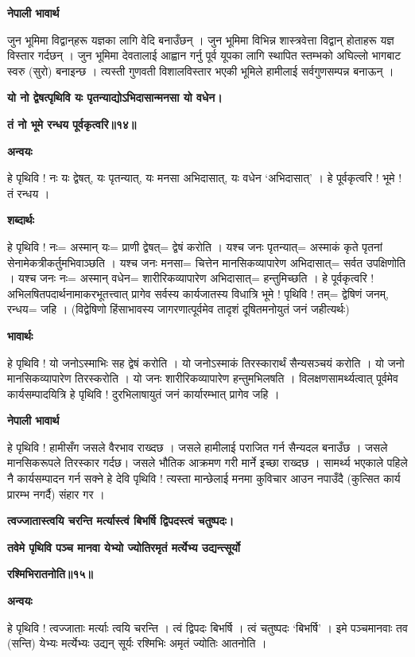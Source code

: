 \documentclass[11pt, a5paper]{article}
\begin{document}
\textbf{नेपाली भावार्थ}

जुन भूमिमा विद्वान्‌हरू यज्ञका लागि वेदि बनाउँछन् । जुन भूमिमा विभिन्न शास्त्रवेत्ता विद्वान् होताहरू यज्ञ विस्तार गर्दछन् । जुन भूमिमा देवतालाई आह्वान गर्नु पूर्व यूपका लागि स्थापित स्तम्भको अघिल्लो भागबाट स्वरु (सुरो) बनाइन्छ । त्यस्ती गुणवती विशालविस्तार भएकी भूमिले हामीलाई सर्वगुणसम्पन्न बनाऊन् ।

\textbf{यो नो द्वेषत्पृथिवि यः पृतन्याद्योऽभिदासान्मनसा यो वधेन।}

\textbf{तं नो भूमे रन्धय पूर्वकृत्वरि॥१४॥}

\textbf{अन्वयः}

हे पृथिवि ! नः यः द्वेषत्, यः पृतन्यात्, यः मनसा अभिदासात्, यः वधेन ‘अभिदासात्’ । हे पूर्वकृत्वरि ! भूमे ! तं रन्धय ।

\textbf{शब्दार्थः}

हे पृथिवि ! नः= अस्मान् यः= प्राणी द्वेषत्= द्वेषं करोति । यश्च जनः पृतन्यात्= अस्माकं कृते पृतनां सेनामेकत्रीकर्तुमभिवाञ्छति । यश्च जनः मनसा= चित्तेन मानसिकव्यापारेण अभिदासात्= सर्वत उपक्षिणोति । यश्च जनः नः= अस्मान् वधेन= शारीरिकव्यापारेण अभिदासात्= हन्तुमिच्छति । हे पूर्वकृत्वरि ! अभिलषितपदार्थनामाकरभूतत्त्वात् प्रागेव सर्वस्य कार्यजातस्य विधात्रि भूमे ! पृथिवि ! तम्= द्वेषिणं जनम्, रन्धय= जहि । (विद्वेषिणो हिंसाभावस्य जागरणात्पूर्वमेव तादृशं दूषितमनोयुतं जनं जहीत्यर्थः)

\textbf{भावार्थः}

हे पृथिवि ! यो जनोऽस्माभिः सह द्वेषं करोति । यो जनोऽस्माकं तिरस्कारार्थं सैन्यसञ्चयं करोति । यो जनो मानसिकव्यापारेण तिरस्करोति । यो जनः शारीरिकव्यापारेण हन्तुमभिलषति । विलक्षणसामर्थ्यत्वात् पूर्वमेव कार्यसम्पादयित्रि हे पृथिवि ! दुरभिलाषायुतं जनं कार्यारम्भात् प्रागेव जहि ।

\textbf{नेपाली भावार्थ}

हे पृथिवि ! हामीसँग जसले वैरभाव राख्दछ । जसले हामीलाई पराजित गर्न सैन्यदल बनाउँछ । जसले मानसिकरूपले तिरस्कार गर्दछ। जसले भौतिक आक्रमण गरी मार्ने इच्छा राख्दछ । सामर्थ्य भएकाले पहिले नै कार्यसम्पादन गर्न सक्ने हे देवि पृथिवि ! त्यस्ता मान्छेलाई मनमा कुविचार आउन नपाउँदै (कुत्सित कार्य प्रारम्भ नगर्दै) संहार गर ।

\textbf{त्वज्जातास्त्वयि चरन्ति मर्त्यास्त्वं बिभर्षि द्विपदस्त्वं चतुष्पदः।}

\textbf{तवेमे पृथिवि पञ्च मानवा येभ्यो ज्योतिरमृतं मर्त्येभ्य उद्यन्त्सूर्यो}

\textbf{रश्मिभिरातनोति॥१५॥}

\textbf{अन्वयः}

हे पृथिवि ! त्वज्जाताः मर्त्याः त्वयि चरन्ति । त्वं द्विपदः बिभर्षि । त्वं चतुष्पदः ‘बिभर्षि’ । इमे पञ्चमानवाः तव (सन्ति) येभ्यः मर्त्येभ्यः उद्यन् सूर्यः रश्मिभिः अमृतं ज्योतिः आतनोति ।
\end{document}
